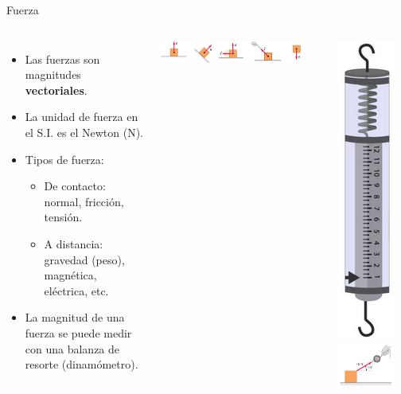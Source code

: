 \documentclass[9pt, aspectratio=169]{beamer}
\begin{document}
\begin{frame}{Fuerza}
\begin{columns} 
\begin{itemize}
    \item Las fuerzas son magnitudes \textbf{vectoriales}.
    \item La unidad de fuerza en el S.I. es el Newton (N).
    \item Tipos de fuerza:
        \begin{itemize}
            \item De contacto: normal, fricción, tensión.
            \item A distancia: gravedad (peso), magnética, eléctrica, etc.
        \end{itemize}
    \item La magnitud de una fuerza se puede medir con una balanza de resorte (dinamómetro).
\end{itemize}
\begin{center}
    \includegraphics[width=0.9\textwidth]{figs/fig-01.pdf}
\end{center}
\begin{center}
    \includegraphics[height=0.4\textheight]{figs/fig-02.png}
    \includegraphics[width=0.8\textwidth]{figs/fig-03.png}

\end{center}
\end{columns}
\end{frame}
\end{document}
